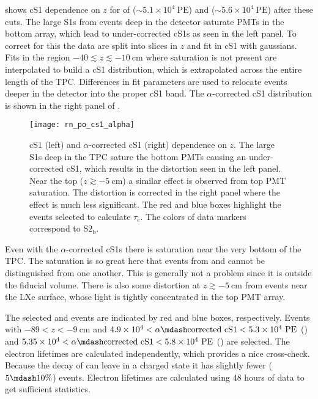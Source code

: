  shows cS1 dependence on $z$ for \alphadecays of 
(${\sim} 5.1 \times 10^4 \ \mathrm{PE}$) and  (${\sim} 5.6 \times 10^4\ \mathrm{PE}$) after these cuts.  The large
S1s from events deep in the detector saturate PMTs in the bottom array, which lead to under-corrected cS1s as seen in the left
panel.  To correct for this the data are split into slices in $z$ and fit in cS1 with gaussians.  Fits in the region
$-40 \lesssim z \lesssim -10\ \mathrm{cm}$ where saturation is not present are interpolated to build a cS1 distribution, which is
extrapolated across the entire length of
the TPC.  Differences in fit parameters are used to relocate events deeper in the detector into the proper cS1 band.  The
$\alpha$-corrected cS1 distribution is shown in the right panel of .

\begin{figure}
\centering
\texttt{[image: rn\_po\_cs1\_alpha]}
\caption{cS1 (left) and $\alpha$-corrected cS1 (right) dependence on $z$.  The large \alphadecay S1s deep in
the TPC sature the bottom PMTs causing an under-corrected cS1, which
results in the distortion seen in the left panel.  Near the top ($z \gtrsim -5\ \mathrm{cm}$) a similar effect is observed from top PMT
saturation.  The distortion is corrected in the right panel where the effect is much less significant.  The red and blue boxes highlight
the events selected to calculate $\tau_e$.  The colors of data markers correspond to $\mathrm{S2_b}$.}
\label{fig:electron_lifetimes_measurement_alphas_s1}
\end{figure}

Even with the $\alpha$-corrected cS1s there is saturation near the very bottom of the TPC.  The saturation is so great
here that events from  and  cannot be distinguished from one another.  This is generally not a problem since it
is outside the fiducial volume.  There is also some distortion at $z \gtrsim -5\ \mathrm{cm}$ from events
near the LXe surface, whose light is tightly concentrated in the top PMT array.

The selected  and  events are indicated by red and blue boxes, respectively.  Events with
$-89< z < -9\ \mathrm{cm}$ and
$4.9 \times 10^4 < \alpha \mdash \mathrm{corrected\ cS1} < 5.3 \times 10^4\ \mathrm{PE}$ () and
$5.35 \times 10^4 < \alpha \mdash \mathrm{corrected\ cS1} < 5.8 \times 10^4\ \mathrm{PE}$ () are selected.  The electron
lifetimes are calculated independently, which provides a nice cross-check.  Because the decay of  can leave 
in a charged state it has slightly fewer ($5 \mdash 10\%$) events.  Electron lifetimes are calculated using 48 hours of data to get
sufficient statistics.

